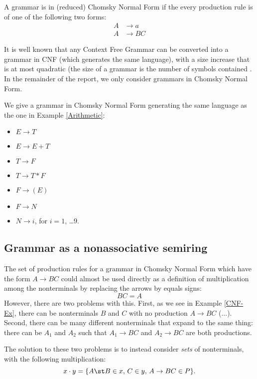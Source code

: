 \begin{Definition}
  A grammar is in (reduced) Chomsky Normal Form \cite{Chomsky} if the every production rule is of one of the following two forms:
  \begin{align*}
  A &\to a\\
  A &\to BC 
  \end{align*}
\end{Definition}
It is well known that any Context Free Grammar can be converted into a grammar in CNF (which generates the same language), with a size increase that is at most quadratic (the size of a grammar is the number of symbols contained \cite{Lange-Leiss}.
In the remainder of the report, we only consider grammars in Chomsky Normal Form.
\begin{Example}
  \label{CNF-Ex}
  We give a grammar in Chomsky Normal Form generating the same language as the one in Example \ref{Arithmetic}:
  \begin{itemize}
  \item \label{pc1} $E \to T$
  \item \label{pc2} $E \to E + T$
  \item \label{pc3} $T \to F$
  \item \label{pc4} $T \to T * F$ 
  \item \label{pc5} $F \to ( E )$
  \item \label{pc6} $F \to N$
  \item \label{pc7} $N \to i$, for $i = 1$, \ldots $9$. 
  \end{itemize}
\end{Example}
\subsection{Grammar as a nonassociative semiring}
The set of production rules for a grammar in Chomsky Normal Form which have the form $A \to BC$ could almost be used directly as a definition of multiplication among the nonterminals by replacing the arrows by equals signs:
\begin{equation*}
  BC = A
\end{equation*}
However, there are two problems with this. First, as we see in Example \ref{CNF-Ex}, there can be nonterminals $B$ and $C$ with no production $A \to BC$ (...). Second, there can be many different nonterminals that expand to the same thing: there can be $A_1$ and $A_2$ such that $A_1 \to BC$ and $A_2 \to BC$ are both productions.

The solution to these two problems is to instead consider \emph{sets} of nonterminals, with the following multiplication:
\begin{equation*}
  x \cdot y = \{A \st B \in x,\, C \in y,\, A \to BC \in P\}.
\end{equation*}

